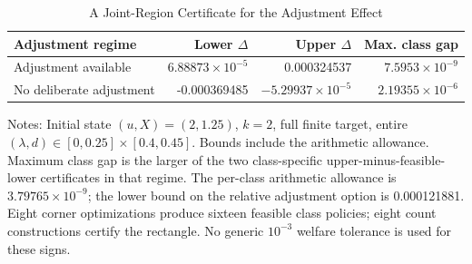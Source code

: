 \begin{table}[!htbp]
\centering\small
\caption{A Joint-Region Certificate for the Adjustment Effect}
\label{tab:r7_decision}
\begin{tabular}{lrrr}
\toprule
Adjustment regime & Lower $\Delta$ & Upper $\Delta$ & Max. class gap \\
\midrule
Adjustment available & $6.88873\times10^{-5}$ & 0.000324537 & $7.5953\times10^{-9}$ \\
No deliberate adjustment & -0.000369485 & $-5.29937\times10^{-5}$ & $2.19355\times10^{-6}$ \\
\bottomrule
\end{tabular}
\par\smallskip
\begin{minipage}{0.98\linewidth}\footnotesize
Notes: Initial state $(u,X)=(2,1.25)$, $k=2$, full finite target, entire $(\lambda,d)\in[0,0.25]\times[0.4,0.45]$. Bounds include the arithmetic allowance. Maximum class gap is the larger of the two class-specific upper-minus-feasible-lower certificates in that regime. The per-class arithmetic allowance is $3.79765\times10^{-9}$; the lower bound on the relative adjustment option is 0.000121881. Eight corner optimizations produce sixteen feasible class policies; eight count constructions certify the rectangle. No generic $10^{-3}$ welfare tolerance is used for these signs.
\end{minipage}
\end{table}
